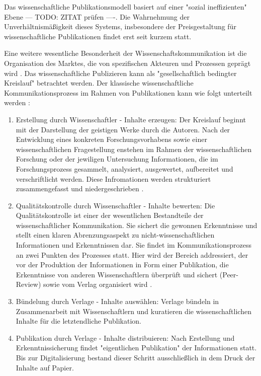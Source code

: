 Das wissenschaftliche Publikationsmodell basiert auf einer "sozial ineffizienten" Ebene \cite{mueller-langer_2010} --- TODO: ZITAT prüfen ----. Die Wahrnehmung der Unverhältnismäßigkeit dieses Systems, insbesondere der Preisgestaltung für wissenschaftliche Publikationen \cite{King_2008} findet erst seit kurzem statt\cite{CREATe_2014}.

Eine weitere wesentliche Besonderheit der Wissenschaftskommunikation ist die Organisation des Marktes, die von spezifischen Akteuren und Prozessen geprägt wird \cite{Hess_2006}. Das wissenschaftliche Publizieren kann als "gesellschaftlich bedingter Kreislauf" \cite{schirmbacher_2009_wisspub} betrachtet werden. Der klassische wissenschaftliche Kommunikationsprozess im Rahmen von Publikationen kann wie folgt unterteilt werden \cite{cite:11b} \cite{Hess_2006}:
\begin{enumerate}
\item Erstellung durch Wissenschaftler - Inhalte erzeugen:
Der Kreislauf beginnt mit der Darstellung der geistigen Werke durch die Autoren\cite{schirmbacher_2009_wisspub}. Nach der Entwicklung eines konkreten Forschungsvorhabens sowie einer wissenschaftlichen Fragestellung enstehen im Rahmen der wissenschaftlichen Forschung oder der jewiligen Untersuchung Informationen\cite{cite:11c}, die im Forschungsprozess gesammelt, analysiert, ausgewertet, aufbereitet und verschriftlicht werden\cite{cite:11d}. Diese Infromationen werden strukturiert zusammengefasst und niedergeschrieben \cite{Hess_2006}.
\item Qualitätskontrolle durch Wissenschaftler - Inhalte bewerten:
Die Qualitätskontrolle ist einer der wesentlichen Bestandteile der wissenschaftlicher Kommunikation. Sie sichert die gewonnen Erkenntnisse\cite{cite:11e} und stellt einen klaren Abrenzungsaspekt zu nicht-wissenschaftlichen Informationen und Erkenntnissen dar\cite{cite:11f}. Sie findet im Kommunikationsprozess an zwei Punkten des Prozesses statt. Hier wird der Bereich addressiert, der vor der Produktion der Informationen in Form einer Publikation, die Erkenntnisse von anderen Wissenschaftlern überprüft und sichert (Peer-Review) \cite{Hess_2006} sowie vom Verlag organisiert wird \cite{schirmbacher_2009_wisspub}.
\item Bündelung durch Verlage - Inhalte auswählen:
Verlage bündeln in Zusammenarbeit mit Wissenschaftlern und kuratieren die wissenschaftlichen Inhalte für die letztendliche Publikation.
\item Publikation durch Verlage - Inhalte distribuieren:
Nach Erstellung und Erkenntnissicherung findet "eigentlichen Publikation" \cite{schirmbacher_2009_wisspub} der Informationen statt. Bis zur Digitalisierung bestand dieser Schritt ausschließlich in dem Druck der Inhalte auf Papier.\cite{cite:11h}

\end{enumerate}
